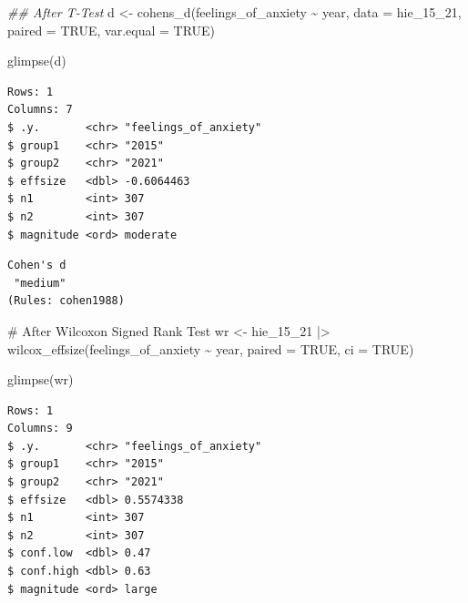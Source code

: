\documentclass[
  letterpaper,
]{krantz}
\makeatletter
\newenvironment{Shaded}{\begin{snugshade}}{\end{snugshade}}
\newcommand{\AttributeTok}[1]{\textcolor[rgb]{0.40,0.45,0.13}{#1}}
\newcommand{\CommentTok}[1]{\textcolor[rgb]{0.37,0.37,0.37}{#1}}
\newcommand{\ConstantTok}[1]{\textcolor[rgb]{0.56,0.35,0.01}{#1}}
\newcommand{\DocumentationTok}[1]{\textcolor[rgb]{0.37,0.37,0.37}{\textit{#1}}}
\newcommand{\FunctionTok}[1]{\textcolor[rgb]{0.28,0.35,0.67}{#1}}
\newcommand{\NormalTok}[1]{\textcolor[rgb]{0.00,0.23,0.31}{#1}}
\newcommand{\OtherTok}[1]{\textcolor[rgb]{0.00,0.23,0.31}{#1}}
\newcommand{\SpecialCharTok}[1]{\textcolor[rgb]{0.37,0.37,0.37}{#1}}
\newenvironment{kframe}{%
\medskip{}
\setlength{\fboxsep}{.8em}
 \def\at@end@of@kframe{}%
 \ifinner\ifhmode%
  \def\at@end@of@kframe{\end{minipage}}%
  \begin{minipage}{\columnwidth}%
 \fi\fi%
 \def\FrameCommand##1{\hskip\@totalleftmargin \hskip-\fboxsep
 \colorbox{shadecolor}{##1}\hskip-\fboxsep
     \hskip-\linewidth \hskip-\@totalleftmargin \hskip\columnwidth}%
 \MakeFramed {\advance\hsize-\width
   \@totalleftmargin\z@ \linewidth\hsize
   \@setminipage}}%
 {\par\unskip\endMakeFramed%
 \at@end@of@kframe}
\renewenvironment{Shaded}{\begin{kframe}}{\end{kframe}}
\makeatother
\begin{document}
\begin{Shaded}
\begin{Highlighting}[]
\DocumentationTok{\#\# After T{-}Test}
\NormalTok{d }\OtherTok{\textless{}{-}} \FunctionTok{cohens\_d}\NormalTok{(feelings\_of\_anxiety }\SpecialCharTok{\textasciitilde{}}\NormalTok{ year,}
               \AttributeTok{data =}\NormalTok{ hie\_15\_21,}
               \AttributeTok{paired =} \ConstantTok{TRUE}\NormalTok{,}
               \AttributeTok{var.equal =} \ConstantTok{TRUE}\NormalTok{)}

\FunctionTok{glimpse}\NormalTok{(d)}
\end{Highlighting}
\end{Shaded}

\begin{verbatim}
Rows: 1
Columns: 7
$ .y.       <chr> "feelings_of_anxiety"
$ group1    <chr> "2015"
$ group2    <chr> "2021"
$ effsize   <dbl> -0.6064463
$ n1        <int> 307
$ n2        <int> 307
$ magnitude <ord> moderate
\end{verbatim}

\begin{Shaded}
\end{Shaded}

\begin{verbatim}
Cohen's d 
 "medium" 
(Rules: cohen1988)
\end{verbatim}

\begin{Shaded}
\begin{Highlighting}[]
\CommentTok{\# After Wilcoxon Signed Rank Test}
\NormalTok{wr }\OtherTok{\textless{}{-}}
\NormalTok{  hie\_15\_21 }\SpecialCharTok{|\textgreater{}}
  \FunctionTok{wilcox\_effsize}\NormalTok{(feelings\_of\_anxiety }\SpecialCharTok{\textasciitilde{}}\NormalTok{ year,}
                   \AttributeTok{paired =} \ConstantTok{TRUE}\NormalTok{, }\AttributeTok{ci =} \ConstantTok{TRUE}\NormalTok{)}

\FunctionTok{glimpse}\NormalTok{(wr)}
\end{Highlighting}
\end{Shaded}

\begin{verbatim}
Rows: 1
Columns: 9
$ .y.       <chr> "feelings_of_anxiety"
$ group1    <chr> "2015"
$ group2    <chr> "2021"
$ effsize   <dbl> 0.5574338
$ n1        <int> 307
$ n2        <int> 307
$ conf.low  <dbl> 0.47
$ conf.high <dbl> 0.63
$ magnitude <ord> large
\end{verbatim}
\end{document}
